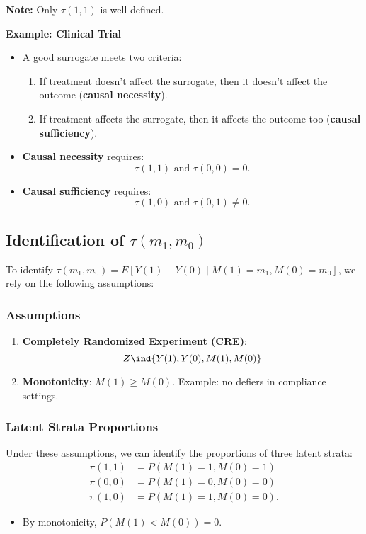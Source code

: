 \textbf{Note:} Only \( \tau(1, 1) \) is well-defined.

\textbf{Example: Clinical Trial}
\begin{itemize}
    \item A good surrogate meets two criteria:
    \begin{enumerate}
        \item If treatment doesn’t affect the surrogate, then it doesn’t affect the outcome (\textbf{causal necessity}).
        \item If treatment affects the surrogate, then it affects the outcome too (\textbf{causal sufficiency}).
    \end{enumerate}
    \item \textbf{Causal necessity} requires:
    \[
    \tau(1,1) \text{ and } \tau(0,0) = 0.
    \]
    \item \textbf{Causal sufficiency} requires:
    \[
    \tau(1,0) \text{ and } \tau(0,1) \neq 0.
    \]
\end{itemize}

\subsection{Identification of $\tau(m_1, m_0)$}
To identify \( \tau(m_1, m_0) = E[Y(1) - Y(0) \mid M(1) = m_1, M(0) = m_0] \), we rely on the following assumptions:

\subsubsection{Assumptions}
\begin{enumerate}
    \item \textbf{Completely Randomized Experiment (CRE)}: \[ Z \ind \{ Y(1), Y(0), M(1), M(0) \} \]
    \item \textbf{Monotonicity}: \( M(1) \geq M(0) \). \newline
    Example: no defiers in compliance settings.
\end{enumerate}

\subsubsection{Latent Strata Proportions}
Under these assumptions, we can identify the proportions of three latent strata:
\begin{align*}
    \pi(1, 1) &= P(M(1) = 1, M(0) = 1) \\
    \pi(0, 0) &= P(M(1) = 0, M(0) = 0) \\
    \pi(1, 0) &= P(M(1) = 1, M(0) = 0).
\end{align*}
\begin{itemize}
    \item By monotonicity, \( P(M(1) < M(0)) = 0 \).
\end{itemize}

